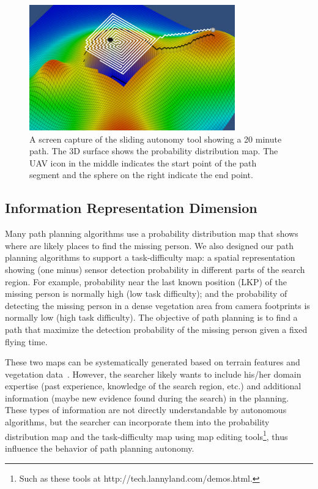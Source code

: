 \documentclass[lettersize, apacite, twoside, HRI]{apa_HRI}
\begin{document}
\begin{figure}
\centering
\includegraphics[width=3.5in]{Dimensions.JPG}
\caption{A screen capture of the sliding autonomy tool showing a 20 minute path. The 3D surface shows the probability distribution map. The UAV icon in the middle indicates the start point of the path segment and the sphere on the right indicate the end point.}
\label{dimensions}
\end{figure}

\subsection{Information Representation Dimension}

Many path planning algorithms use a probability distribution map that shows where are likely places to find the missing person. We also designed our path planning algorithms to support a task-difficulty map: a spatial representation showing (one minus) sensor detection probability in different parts of the search region. For example, probability near the last known position (LKP) of the missing person is normally high (low task difficulty); and the probability of detecting the missing person in a dense vegetation area from camera footprints is normally low (high task difficulty). The objective of path planning is to find a path that maximize the detection probability of the missing person given a fixed flying time. 

These two maps can be systematically generated based on terrain features and vegetation data~\cite{Lin2010Bayesian, Lin2014Hierarchical}. However, the searcher likely wants to include his/her domain expertise (past experience, knowledge of the search region, etc.) and additional information (maybe new evidence found during the search) in the planning. These types of information are not directly understandable by autonomous algorithms, but the searcher can incorporate them into the probability distribution map and the task-difficulty map using map editing tools\footnote{Such as these tools at http://tech.lannyland.com/demos.html.}, thus influence the behavior of path planning autonomy.
\end{document}
